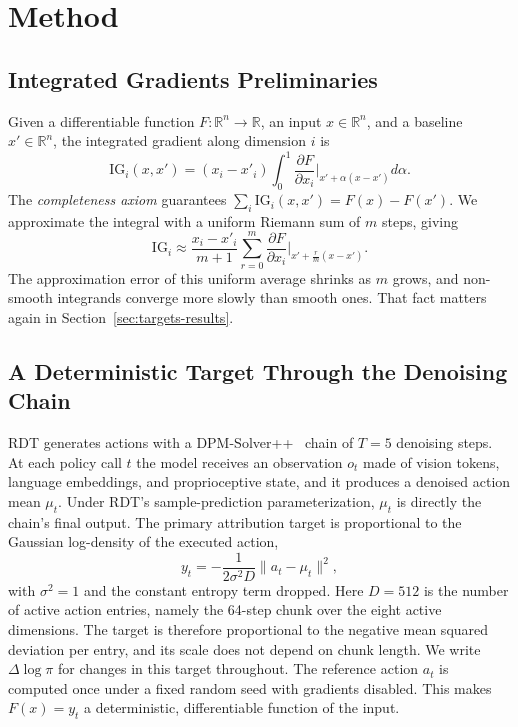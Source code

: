 \documentclass{article}
\begin{document}
\section{Method}

\subsection{Integrated Gradients Preliminaries}

Given a differentiable function $F \!:\! \mathbb{R}^n \!\to\! \mathbb{R}$, an input $x \in \mathbb{R}^n$, and a baseline $x' \in \mathbb{R}^n$, the integrated gradient along dimension $i$ is
\begin{equation}
\mathrm{IG}_i(x, x') = (x_i - x'_i) \int_0^1 \frac{\partial F}{\partial x_i}\bigg|_{x' + \alpha(x - x')} d\alpha .
\label{eq:ig}
\end{equation}
The \emph{completeness axiom} guarantees $\sum_i \mathrm{IG}_i(x, x') = F(x) - F(x')$.
We approximate the integral with a uniform Riemann sum of $m$ steps, giving
\begin{equation}
\mathrm{IG}_i \approx \frac{x_i - x'_i}{m+1} \sum_{r=0}^{m} \frac{\partial F}{\partial x_i}\bigg|_{x' + \frac{r}{m}(x - x')} .
\label{eq:riemann}
\end{equation}
The approximation error of this uniform average shrinks as $m$ grows, and non-smooth integrands converge more slowly than smooth ones.
That fact matters again in Section~\ref{sec:targets-results}.

\subsection{A Deterministic Target Through the Denoising Chain}
\label{sec:target}

RDT generates actions with a DPM-Solver++~\cite{lu2022dpm} chain of $T{=}5$ denoising steps.
At each policy call $t$ the model receives an observation $o_t$ made of vision tokens, language embeddings, and proprioceptive state, and it produces a denoised action mean $\mu_t$.
Under RDT's sample-prediction parameterization, $\mu_t$ is directly the chain's final output.
The primary attribution target is proportional to the Gaussian log-density of the executed action,
\begin{equation}
y_t = -\frac{1}{2\sigma^2 D} \lVert a_t - \mu_t \rVert^2 ,
\label{eq:target}
\end{equation}
with $\sigma^2 = 1$ and the constant entropy term dropped.
Here $D{=}512$ is the number of active action entries, namely the 64-step chunk over the eight active dimensions.
The target is therefore proportional to the negative mean squared deviation per entry, and its scale does not depend on chunk length.
We write $\Delta\log\pi$ for changes in this target throughout.
The reference action $a_t$ is computed once under a fixed random seed with gradients disabled.
This makes $F(x) = y_t$ a deterministic, differentiable function of the input.
\end{document}
